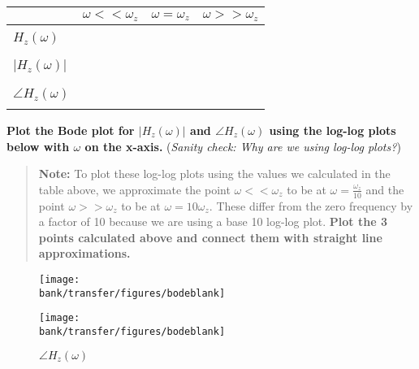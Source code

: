\begin{enumerate}
\begin{enumerate}
    \begin{table}[h]
      \centering
      \begin{tabular}{| l | >{\centering\arraybackslash}m{6em} | >{\centering\arraybackslash}m{6em} | >{\centering\arraybackslash}m{6em} |} 
      \cline{2-4}
      \multicolumn{1}{l|}{}& $\omega << \omega_z$ & $\omega = \omega_z$ & $\omega >> \omega_z$ \\
      \hline
      &&&\\
      $H_z(\omega)$        &                      &                     &                      \\
      &&&\\
      \hline
      &&&\\
      $|H_z(\omega)|$      &                      &                     &                      \\
      &&&\\
      \hline
      &&&\\
      $\angle H_z(\omega)$ &                      &                     &                      \\
      &&&\\
      \hline
      \end{tabular}
    \end{table}

    \qitem \textbf{Plot the Bode plot for $|H_z(\omega)|$ and $\angle H_z(\omega)$ using the log-log plots below with $\omega$ on the x-axis.} (\textit{Sanity check: Why are we using log-log plots?})

    \begin{quote}
    \textbf{Note:} To plot these log-log plots using the values we calculated in the table above, we approximate the point $\omega << \omega_z$
    to be at $\omega = \frac{\omega_z}{10}$ and the point $\omega >> \omega_z$ to be at $\omega = 10\omega_z$.
    These differ from the zero frequency by a factor of 10 because we are using a base 10 log-log plot. \textbf{Plot the 3 points calculated above and connect them with straight line approximations.}
    \end{quote}

\end{enumerate}

\begin{figure}[!h]
  \centering
  \begin{minipage}[b]{0.45\textwidth}
  \texttt{[image: \\bank/transfer/figures/bodeblank]}
    \caption*{$|H_z(\omega)|$}
  \end{minipage}
  \hfill
  \begin{minipage}[b]{0.45\textwidth}
  \texttt{[image: \\bank/transfer/figures/bodeblank]}
    \caption*{$\angle H_z(\omega)$}
  \end{minipage}
\end{figure}


\end{enumerate}
